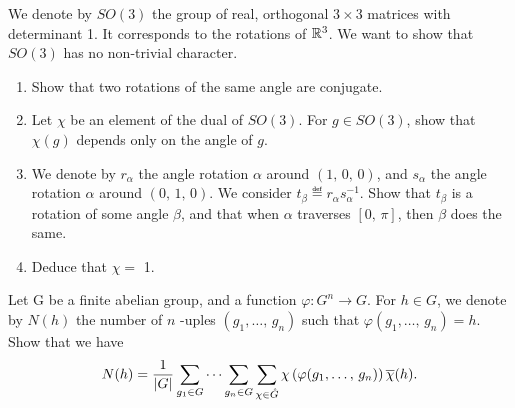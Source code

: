 \begin{exo}
\label{exo-dual-so3}

 We denote by $SO(3)$ the group of real, orthogonal $ 3 \times 3 $ matrices with determinant 1. It corresponds to the rotations of $\mathbb{R}^3 $. We want to show that $SO(3)$ has no non-trivial character. \begin{enumerate}
\item Show that two rotations of the same angle are conjugate.
\item Let $\chi$ be an element of the dual of $ SO(3)$. For $g \in SO(3)$, show that $\chi(g)$ depends only on the angle of $g$.
\item We denote by $r_{\alpha}$ the angle rotation $\alpha$ around $ (1, \, 0, \, 0)$, and $ s_{\alpha}$ the angle rotation $\alpha$ around $ (0, \, 1, \, 0)$. We consider $t_{\beta} \eqdef r_{\alpha} s_{\alpha}^{-1}$. Show that $t_{\beta}$ is a rotation of some angle $\beta $, and that when $\alpha$ traverses $[0, \, \pi]$, then $\beta $ does the same.
\item Deduce that $\chi = $ 1.
\end{enumerate}
\end{exo}


\begin{exo}
\label{exo-enombrement-solutions}

 Let G be a finite abelian group, and a function $\varphi: G^n \rightarrow G$. For $ h \in G$, we denote by $ N(h)$ the number of $n$ -uples $ (g_1, \ldots, \, g_n)$ such that $\varphi (g_1, \ldots, \, g_n ) = h $. Show that we have
\begin{equation*}
N(h) = \frac{1}{|G|} \sum_{g_1 \in G}{\cdots \sum_{g_n \in G}{\sum_{\chi \in \hat{G}}{\chi \left(\varphi (g_1, \ldots, \, g_n) \right) \overline{\chi}(h)}}}.
\end{equation*}

\end{exo}



